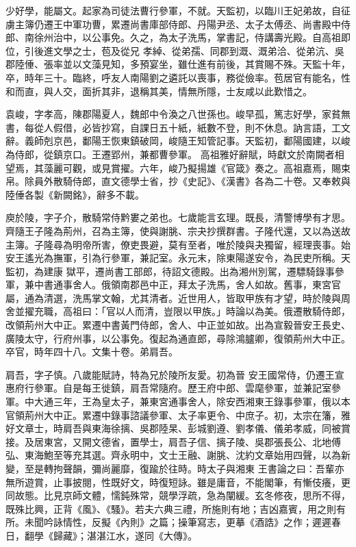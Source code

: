 \begin{pinyinscope}
 少好學，能屬文。起家為司徒法曹行參軍，不就。天監初，以臨川王妃弟故，自征虜主簿仍遷王中軍功曹，累遷尚書庫部侍郎、丹陽尹丞、太子太傅丞、尚書殿中侍郎、南徐州治中，以公事免。久之，為太子洗馬，掌書記，侍講壽光殿。自高祖即位，引後進文學之士，苞及從兄
 孝綽、從弟孺、同郡到溉、溉弟洽、從弟沆、吳郡陸倕、張率並以文藻見知，多預宴坐，雖仕進有前後，其賞賜不殊。天監十年，卒，時年三十。臨終，呼友人南陽劉之遴託以喪事，務從儉率。苞居官有能名，性和而直，與人交，面折其非，退稱其美，情無所隱，士友咸以此歎惜之。



 袁峻，字孝高，陳郡陽夏人，魏郎中令渙之八世孫也。峻早孤，篤志好學，家貧無書，每從人假借，必皆抄寫，自課日五十紙，紙數不登，則不休息。訥言語，工文辭。義師剋京邑，鄱陽王恢東鎮破岡，峻隨王知管記事。天監初，鄱陽國建，以峻為侍郎，從鎮京口。王遷郢州，兼都曹參軍。
 高祖雅好辭賦，時獻文於南闕者相望焉，其藻麗可觀，或見賞擢。六年，峻乃擬揚雄《官箴》奏之。高祖嘉焉，賜束帛。除員外散騎侍郎，直文德學士省，抄《史記》、《漢書》各為二十卷。又奉敕與陸倕各製《新闕銘》，辭多不載。



 庾於陵，字子介，散騎常侍黔婁之弟也。七歲能言玄理。既長，清警博學有才思。齊隨王子隆為荊州，召為主簿，使與謝朓、宗夬抄撰群書。子隆代還，又以為送故主簿。子隆尋為明帝所害，僚吏畏避，莫有至者，唯於陵與夬獨留，經理喪事。始安王遙光為撫軍，引為行參軍，兼記室。永元末，除東陽遂安令，為民吏所稱。天監初，為建康
 獄平，遷尚書工部郎，待詔文德殿。出為湘州別駕，遷驃騎錄事參軍，兼中書通事舍人。俄領南郡邑中正，拜太子洗馬，舍人如故。舊事，東宮官屬，通為清選，洗馬掌文翰，尤其清者。近世用人，皆取甲族有才望，時於陵與周舍並擢充職，高祖曰：「官以人而清，豈限以甲族。」時論以為美。俄遷散騎侍郎，改領荊州大中正。累遷中書黃門侍郎，舍人、中正並如故。出為宣毅晉安王長史、廣陵太守，行府州事，以公事免。復起為通直郎，尋除鴻臚卿，復領荊州大中正。卒官，時年四十八。文集十卷。弟肩吾。



 肩吾，字子慎。八歲能賦詩，特為兄於陵所友愛。初為晉
 安王國常侍，仍遷王宣惠府行參軍。自是每王徙鎮，肩吾常隨府。歷王府中郎、雲麾參軍，並兼記室參軍。中大通三年，王為皇太子，兼東宮通事舍人，除安西湘東王錄事參軍，俄以本官領荊州大中正。累遷中錄事諮議參軍、太子率更令、中庶子。初，太宗在籓，雅好文章士，時肩吾與東海徐摛、吳郡陸杲、彭城劉遵、劉孝儀、儀弟孝威，同被賞接。及居東宮，又開文德省，置學士，肩吾子信、摛子陵、吳郡張長公、北地傅弘、東海鮑至等充其選。齊永明中，文士王融、謝朓、沈約文章始用四聲，以為新變，至是轉拘聲韻，彌尚麗靡，復踰於往時。時太子與湘東
 王書論之曰：吾輩亦無所遊賞，止事披閱，性既好文，時復短詠。雖是庸音，不能閣筆，有慚伎癢，更同故態。比見京師文體，懦鈍殊常，競學浮疏，急為闡緩。玄冬修夜，思所不得，既殊比興，正背《風》、《騷》。若夫六典三禮，所施則有地；吉凶嘉賓，用之則有所。未聞吟詠情性，反擬《內則》之篇；操筆寫志，更摹《酒誥》之作；遲遲春日，翻學《歸藏》；湛湛江水，遂同《大傳》。




\end{pinyinscope}
